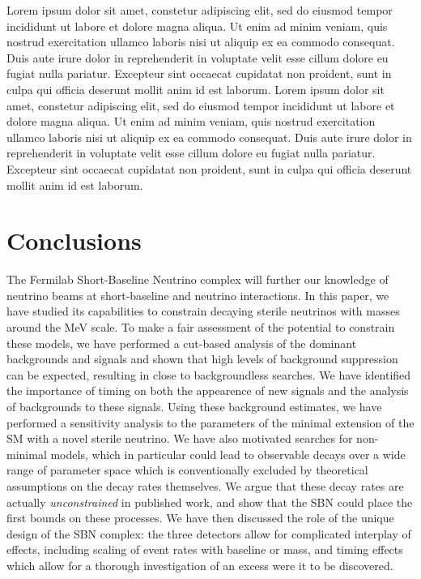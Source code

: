 \documentclass[11pt, a4paper]{article}
\newcommand{\lorem}{ \textcolor[rgb]{0.8,0.8,0.8}{Lorem ipsum dolor sit amet, constetur
adipiscing elit, sed do eiusmod tempor incididunt ut labore et dolore magna
aliqua. Ut enim ad minim veniam, quis nostrud exercitation ullamco laboris nisi
ut aliquip ex ea commodo consequat. Duis aute irure dolor in reprehenderit in
voluptate velit esse cillum dolore eu fugiat nulla pariatur. Excepteur sint
occaecat cupidatat non proident, sunt in culpa qui officia deserunt mollit anim
id est laborum.}}
\begin{document}





\lorem\lorem

\section{Conclusions}

The Fermilab Short-Baseline Neutrino complex will further our knowledge of
neutrino beams at short-baseline and neutrino interactions. In this paper, we
have studied its capabilities to constrain decaying sterile neutrinos with
masses around the MeV scale. To make a fair assessment of the potential to
constrain these models, we have performed a cut-based analysis of the dominant
backgrounds and signals and shown that high levels of background suppression
can be expected, resulting in close to backgroundless searches. We have
identified the importance of timing on both the appearence of new signals and
the analysis of backgrounds to these signals. Using these background estimates,
we have performed a sensitivity analysis to the parameters of the minimal
extension of the SM with a novel sterile neutrino. We have also motivated
searches for non-minimal models, which in particular could lead to observable
decays over a wide range of parameter space which is conventionally excluded by
theoretical assumptions on the decay rates themselves. We argue that these
decay rates are actually \emph{unconstrained} in published work, and show that
the SBN could place the first bounds on these processes. We have then discussed
the role of the unique design of the SBN complex: the three detectors allow for
complicated interplay of effects, including scaling of event rates with
baseline or mass, and timing effects which allow for a thorough investigation
of an excess were it to be discovered. 
\end{document}
